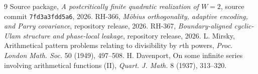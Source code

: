 \documentclass[11pt]{article}
\begin{document}
\begingroup\sloppy
\begin{thebibliography}{9}
Source package, \emph{A postcritically finite quadratic realization of
$W=2$}, source commit \texttt{7fd3a3fdd5a6}, 2026.
RH-366, \emph{M\"obius orthogonality, adaptive encoding, and Parry
covariance}, repository release, 2026.
RH-367, \emph{Boundary-aligned cyclic-Ulam structure and phase-local
leakage}, repository release, 2026.
L. Mirsky, Arithmetical pattern problems relating to divisibility by
$r$th powers, \emph{Proc. London Math. Soc.} 50 (1949), 497--508.
H. Davenport, On some infinite series involving arithmetical functions (II),
\emph{Quart. J. Math.} 8 (1937), 313--320.
\end{thebibliography}
\endgroup
\end{document}
